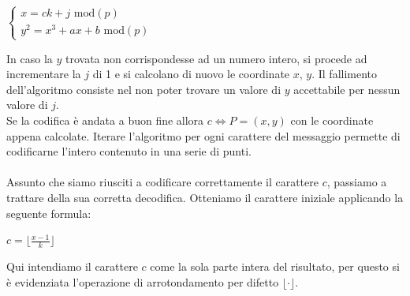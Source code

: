 \documentclass[a4paper,12pt]{tesiinfo}
\newcommand\ddfrac[2]{\frac{\displaystyle #1}{\displaystyle #2}}
\begin{document}
\begin{center}
$\begin{cases}
 x = ck + j \text{ mod}(p)\\
 y^2 = x^3 + ax + b \text{ mod}(p)
 \end{cases}$
\end{center}
In caso la $y$ trovata non corrispondesse ad un numero intero, si procede ad incrementare la $j$ di 1 e si calcolano di nuovo le coordinate $x$, $y$. Il fallimento dell'algoritmo consiste nel non poter trovare un valore di $y$ accettabile per nessun valore di $j$.
\\
Se la codifica \`e andata a buon fine allora $c \iff P=(x, y)$ con le coordinate appena calcolate. Iterare l'algoritmo per ogni carattere del messaggio permette di codificarne l'intero contenuto in una serie di punti. 
\\
\\
Assunto che siamo riusciti a codificare correttamente il carattere $c$, passiamo a trattare della sua corretta decodifica. Otteniamo il carattere iniziale applicando la seguente formula:
\begin{center}
 $c = \Big \lfloor \ddfrac{x-1}{k} \Big \rfloor$
\end{center}
Qui intendiamo il carattere $c$ come la sola parte intera del risultato, per questo si \`e evidenziata l'operazione di arrotondamento per difetto $\lfloor \cdot \rfloor$.
%
%
%
%
%
%
%
\end{document}
